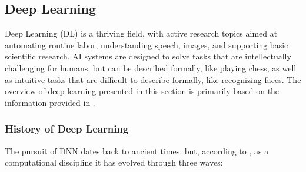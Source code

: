 \subsection{Deep Learning} 
\label{chap:Deep_Learning_subchap}
Deep Learning (DL) is a thriving field, with active research topics aimed at automating routine labor, understanding speech, images, and supporting basic scientific research. AI systems are designed to solve tasks that are intellectually challenging for humans, but can be described formally, like playing chess, as well as intuitive tasks that are difficult to describe formally, like recognizing faces. The overview of deep learning presented in this section is primarily based on the information provided in \cite{Deep-Learning-book}.
\subsubsection{History of Deep Learning}
The pursuit of DNN dates back to ancient times, but, according to \cite{Deep-Learning-book}, as a computational discipline it has evolved through three waves:
